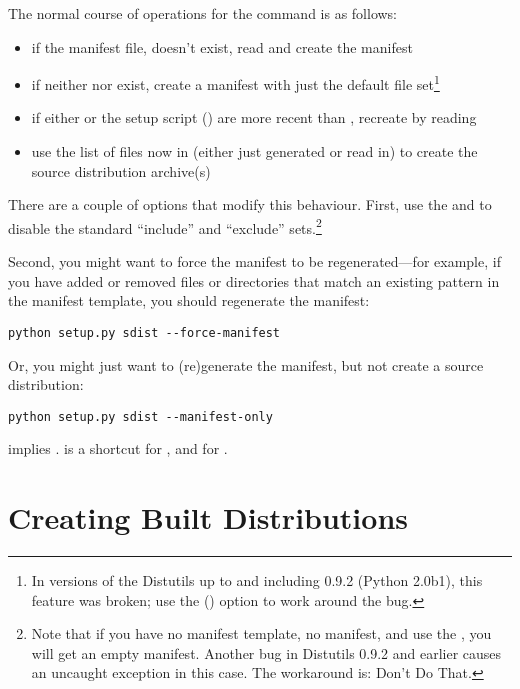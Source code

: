 \documentclass{howto}
\begin{document}
The normal course of operations for the  command is as
follows:
\begin{itemize}
\item if the manifest file,  doesn't exist, read
   and create the manifest
\item if neither  nor  exist, create a
  manifest with just the default file set\footnote{In versions of the
    Distutils up to and including 0.9.2 (Python 2.0b1), this feature was
    broken; use the  ()
    option to work around the bug.}
\item if either  or the setup script ()
  are more recent than , recreate  by
  reading 
\item use the list of files now in  (either just
  generated or read in) to create the source distribution archive(s)
\end{itemize}
There are a couple of options that modify this behaviour.  First, use
the  and  to
disable the standard ``include'' and ``exclude'' sets.\footnote{Note
  that if you have no manifest template, no manifest, and use the
  , you will get an empty manifest.  Another
  bug in Distutils 0.9.2 and earlier causes an uncaught exception in
  this case.  The workaround is: Don't Do That.}

Second, you might want to force the manifest to be regenerated---for
example, if you have added or removed files or directories that match an
existing pattern in the manifest template, you should regenerate the
manifest:
\begin{verbatim}
python setup.py sdist --force-manifest
\end{verbatim}

Or, you might just want to (re)generate the manifest, but not create a
source distribution:
\begin{verbatim}
python setup.py sdist --manifest-only
\end{verbatim}
 implies .
 is a shortcut for , and
 for .


\section{Creating Built Distributions}
\label{built-dist}
\end{document}
